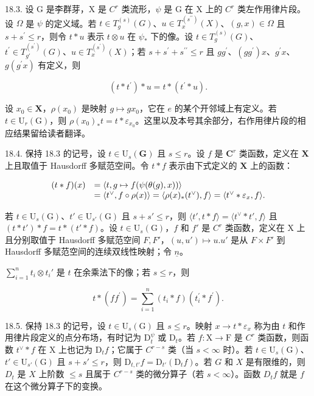 18.3. 设 G 是李群芽，X 是 \(C^{r}\) 类流形，\(\psi\) 是 G 在 X 上的 \(C^{r}\) 类左作用律片段。设 \(\Omega\) 是 \(\psi\) 的定义域。若 \(t \in T_{g}^{(s)}(G)\)、\(u \in T_{x}^{(s^{\prime\prime})}(X)\)、\((g, x) \in \Omega\) 且 \(s + s^{\prime} \leqslant r\)，则令 \(t * u\) 表示 \(t \otimes u\) 在 \(\psi_{*}\) 下的像。设 \(t \in T_{g}^{(s)}(G)\)、\(t^{\prime} \in T_{g'}^{(s^{\prime})}(G)\)、\(u \in T_{x}^{(s^{\prime})}(X)\)；若 \(s + s^{\prime} + s^{\prime\prime} \leqslant r\) 且 \(gg^{\prime}\)、\((gg^{\prime})x\)、\(g^{\prime}x\)、\(g(g^{\prime}x)\) 有定义，则

\[
(t * t ^ {\prime}) * u = t * (t ^ {\prime} * u).
\]

设 \(x_0 \in \mathbf{X}\)，\(\rho(x_0)\) 是映射 \(g \mapsto gx_0\)，它在 \(e\) 的某个开邻域上有定义。若 \(t \in \mathrm{U}_r(\mathrm{G})\)，则 \(\rho(x_0)_*t = t * \varepsilon_{x_0}\)。这里以及本号其余部分，右作用律片段的相应结果留给读者翻译。

18.4. 保持 18.3 的记号，设 \(t \in \mathrm{U}_s(\mathbf{G})\) 且 \(s \leqslant r\)。设 \(f\) 是 \(\mathbf{C}^r\) 类函数，定义在 \(\mathbf{X}\) 上且取值于 Hausdorff 多赋范空间。令 \(t * f\) 表示由下式定义的 \(\mathbf{X}\) 上的函数：

\[
\begin{array}{r l} (t * f) (x) & = \langle t, g \mapsto f (\psi (\theta (g), x)) \rangle \\ & = \langle t ^ {\vee}, f \circ \rho (x) \rangle = \langle \rho (x) _ {*} (t ^ {\vee}), f \rangle = \langle t ^ {\vee} * \varepsilon_ {x}, f \rangle . \end{array}
\]

若 \(t \in \mathrm{U}_s(\mathrm{G})\)、\(t' \in \mathrm{U}_{s'}(\mathrm{G})\) 且 \(s + s' \leqslant r\)，则 \(\langle t', t * f \rangle = \langle t^\vee * t', f \rangle\) 且 \((t * t') * f = t * (t' * f)\)。设 \(t \in \mathrm{U}_s(\mathrm{G})\)，\(f\) 和 \(f'\) 是 \(C^r\) 类函数，定义在 X 上且分别取值于 Hausdorff 多赋范空间 \(F, F'\)，\((u, u') \mapsto u. u'\) 是从 \(F \times F'\) 到 Hausdorff 多赋范空间的连续双线性映射；令 \(\underline{n}\)。

\(\sum_{i=1}^{n} t_i \otimes t_i'\) 是 \(t\) 在余乘法下的像；若 \(s \leqslant r\)，则

\[
t * (f f ^ {\prime}) = \sum_ {i = 1} ^ {n} (t _ {i} * f) (t _ {i} ^ {\prime} * f ^ {\prime}).
\]

18.5. 保持 18.3 的记号，设 \(t \in \mathrm{U}_s(\mathrm{G})\) 且 \(s \leqslant r\)。映射 \(x \to t * \varepsilon_x\) 称为由 \(t\) 和作用律片段定义的点分布场，有时记为 \(\mathrm{D}_t^{\psi}\) 或 \(\mathrm{D}_t\)。若 \(f: \mathrm{X} \to \mathrm{F}\) 是 \(C^r\) 类函数，则函数 \(t^{\vee} * f\) 在 \(\mathrm{X}\) 上也记为 \(\mathrm{D}_t f\)；它属于 \(C^{r - s}\) 类（当 \(s < \infty\) 时）。若 \(t \in \mathrm{U}_s(\mathrm{G})\)、\(t' \in \mathrm{U}_{s'}(\mathrm{G})\) 且 \(s + s' \leqslant r\)，则 \(\mathrm{D}_{t,t'} f = \mathrm{D}_{t'}(\mathrm{D}_t f)\)。若 \(G\) 和 \(X\) 是有限维的，则 \(D_t\) 是 \(X\) 上阶数 \(\leqslant s\) 且属于 \(C^{r - s}\) 类的微分算子（若 \(s < \infty\)）。函数 \(D_t f\) 就是 \(f\) 在这个微分算子下的变换。


